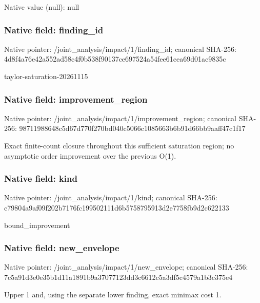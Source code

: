 \documentclass[10pt,a4paper]{article}
\begin{document}
Native value (null): null

\subsubsection{Native field: finding\_\allowbreak{}id}
Native pointer: /joint\_\allowbreak{}analysis/impact/1/finding\_\allowbreak{}id; canonical SHA-256: 4d8f4a76e42a552ad58c4f0b538f90137ce697524a54fee61cea69d01ac9835c

\begingroup\raggedright\sloppy taylor-saturation-20261115\par\endgroup

\subsubsection{Native field: improvement\_\allowbreak{}region}
Native pointer: /joint\_\allowbreak{}analysis/impact/1/improvement\_\allowbreak{}region; canonical SHA-256: 98711988648c5d67d770f270bd040c5066c1085663b6b91d66bb9aaff47c1f17

\begingroup\raggedright\sloppy Exact finite-count closure throughout this sufficient saturation region;\allowbreak{} no asymptotic order improvement over the previous O(1).\par\endgroup

\subsubsection{Native field: kind}
Native pointer: /joint\_\allowbreak{}analysis/impact/1/kind; canonical SHA-256: c79804a9af09f202b7176fc199502111d6b5758795913d2e7758fb9d2c622133

\begingroup\raggedright\sloppy bound\_\allowbreak{}improvement\par\endgroup

\subsubsection{Native field: new\_\allowbreak{}envelope}
Native pointer: /joint\_\allowbreak{}analysis/impact/1/new\_\allowbreak{}envelope; canonical SHA-256: 7c5a91d3e0e35b1d11a1891b9a37077123dd3c6612c5a3df5c4579a1b3c375e4

\begingroup\raggedright\sloppy Upper 1 and,\allowbreak{} using the separate lower finding,\allowbreak{} exact minimax cost 1.\par\endgroup
\end{document}
